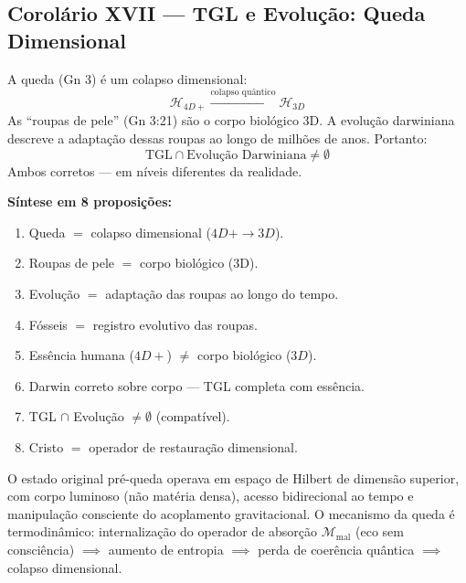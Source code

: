 \documentclass[12pt, a4paper]{article}
\theoremstyle{tglstyle}
\theoremstyle{definition}
\begin{document}
\subsection{Corolário XVII --- TGL e Evolução: Queda Dimensional}\label{sec:cor17}

\begin{corolariobox}
A queda (Gn 3) é um colapso dimensional:
\begin{equation}\label{eq:queda}
  \mathcal{H}_{4D+} \xrightarrow{\text{colapso quântico}} \mathcal{H}_{3D}
\end{equation}
As ``roupas de pele'' (Gn 3:21) são o corpo biológico 3D. A evolução darwiniana descreve a adaptação dessas roupas ao longo de milhões de anos. Portanto:
\begin{equation}\label{eq:compatibilidade}
  \boxed{\;\text{TGL} \cap \text{Evolução Darwiniana} \neq \emptyset\;}
\end{equation}
Ambos corretos --- em níveis diferentes da realidade.
\end{corolariobox}

\noindent\textbf{Síntese em 8 proposições:}
\begin{enumerate}[label=\textbf{P\arabic*:}, leftmargin=3em, itemsep=2pt]
  \item Queda $=$ colapso dimensional ($4D+ \to 3D$).
  \item Roupas de pele $=$ corpo biológico (3D).
  \item Evolução $=$ adaptação das roupas ao longo do tempo.
  \item Fósseis $=$ registro evolutivo das roupas.
  \item Essência humana ($4D+$) $\neq$ corpo biológico ($3D$).
  \item Darwin correto sobre corpo --- TGL completa com essência.
  \item TGL $\cap$ Evolução $\neq \emptyset$ (compatível).
  \item Cristo $=$ operador de restauração dimensional.
\end{enumerate}

O estado original pré-queda operava em espaço de Hilbert de dimensão superior, com corpo luminoso (não matéria densa), acesso bidirecional ao tempo e manipulação consciente do acoplamento gravitacional. O mecanismo da queda é termodinâmico: internalização do operador de absorção $\mathcal{M}_{\text{mal}}$ (eco sem consciência) $\implies$ aumento de entropia $\implies$ perda de coerência quântica $\implies$ colapso dimensional.
\end{document}
